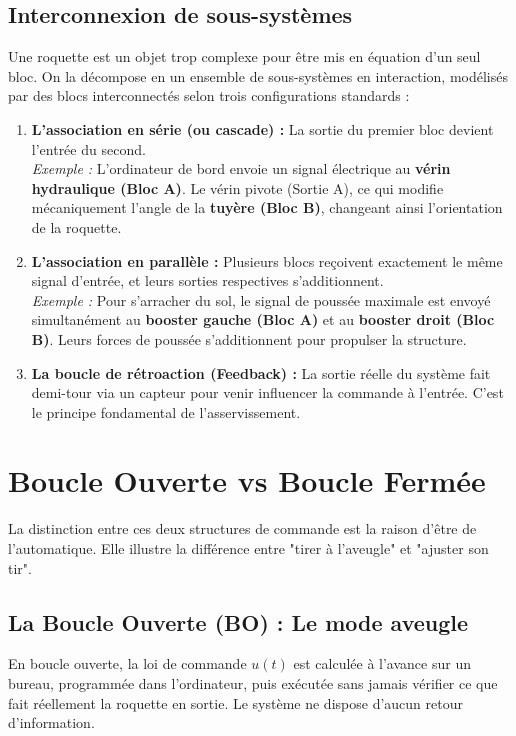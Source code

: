 \documentclass[11pt,a4paper]{report}
\begin{document}
\subsection{Interconnexion de sous-systèmes}
Une roquette est un objet trop complexe pour être mis en équation d'un seul bloc. On la décompose en un ensemble de sous-systèmes en interaction, modélisés par des blocs interconnectés selon trois configurations standards :

\begin{enumerate}
    \item \textbf{L'association en série (ou cascade) :} La sortie du premier bloc devient l'entrée du second. \\
    \textit{Exemple :} L'ordinateur de bord envoie un signal électrique au \textbf{vérin hydraulique (Bloc A)}. Le vérin pivote (Sortie A), ce qui modifie mécaniquement l'angle de la \textbf{tuyère (Bloc B)}, changeant ainsi l'orientation de la roquette.
    
    \item \textbf{L'association en parallèle :} Plusieurs blocs reçoivent exactement le même signal d'entrée, et leurs sorties respectives s'additionnent. \\
    \textit{Exemple :} Pour s'arracher du sol, le signal de poussée maximale est envoyé simultanément au \textbf{booster gauche (Bloc A)} et au \textbf{booster droit (Bloc B)}. Leurs forces de poussée s'additionnent pour propulser la structure.
    
    \item \textbf{La boucle de rétroaction (Feedback) :} La sortie réelle du système fait demi-tour via un capteur pour venir influencer la commande à l'entrée. C'est le principe fondamental de l'asservissement.
\end{enumerate}

\section{Boucle Ouverte vs Boucle Fermée}

La distinction entre ces deux structures de commande est la raison d'être de l'automatique. Elle illustre la différence entre "tirer à l'aveugle" et "ajuster son tir".

\subsection{La Boucle Ouverte (BO) : Le mode aveugle}
En boucle ouverte, la loi de commande $u(t)$ est calculée à l'avance sur un bureau, programmée dans l'ordinateur, puis exécutée sans jamais vérifier ce que fait réellement la roquette en sortie. Le système ne dispose d'aucun retour d'information.
\end{document}
